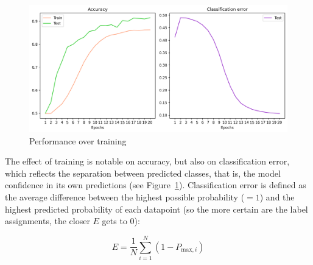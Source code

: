 \documentclass{article}
\begin{document}
\begin{figure}
  \centering
  \includegraphics[width=\textwidth]{RoBERTa_learning_curves_2}
  \caption{Performance over training}
  \label{fig:roberta-learning-2}
\end{figure}

The effect of training is notable on accuracy, but also on classification error, which reflects the separation between predicted classes, that is, the model confidence in its own predictions (see Figure~\ref{fig:roberta-learning-2}). Classification error is defined as the average difference between the highest possible probability (\( =1 \)) and the highest predicted probability of each datapoint (so the more certain are the label assignments, the closer \( E \) gets to 0):

\[
E = \frac{1}{N} \sum_{i=1}^{N} (1 - P_{\text{max},i})
\]
\end{document}
